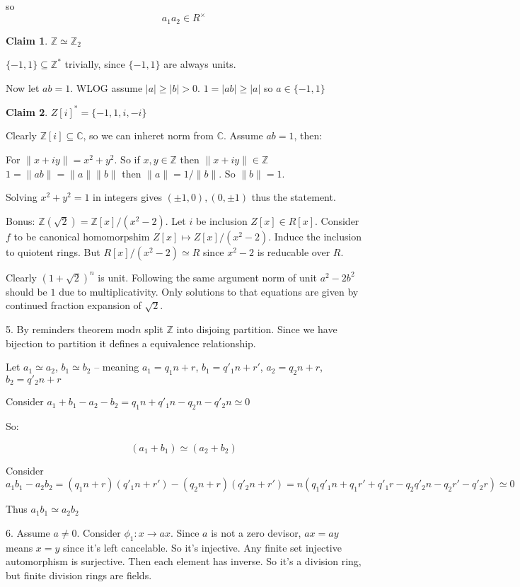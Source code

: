\documentclass{amsart}
\def\Z{\mathbb{Z}}
\def\C{\mathbb{C}}
\newtheorem{claim}{Claim}
\begin{document}
so $$a_1 a_2 \in R^{\times}$$

\begin{claim}
    $\Z \simeq \Z_2$
\end{claim}
$\{-1, 1\} \subseteq \Z^{*}$ trivially, since $\{-1,1\}$ are always units.

Now let $ab = 1$.  WLOG assume $|a| \geq |b| > 0$. $1 = |ab| \geq |a|$ so $a \in \{-1 , 1\}$

\begin{claim}
    $Z[i]^* = \{-1, 1, i, -i \}$ 
\end{claim}
Clearly $\Z[i] \subseteq \C$, so we can inheret norm from $\C$. Assume $ab = 1$, then:

For $\| x + iy \| = x^2 + y^2$. So if $x,y \in \Z$ then $\|x + i y \| \in \Z$
$1 = \|ab\| = \|a\| \|b\|$ then $\|a\| = 1 / \|b\|$. So $\| b \| = 1$.

Solving $x^2 + y^2 = 1$ in integers gives $(\pm 1,0), (0, \pm 1)$ thus the statement.

Bonus: $\Z (\sqrt{2}) = \Z[x] / (x^2 - 2 )$. Let $i$ be inclusion $Z[x] \in R[x]$. 
Consider $f$ to be canonical homomorpshim  $Z[x] \mapsto Z[x] / (x^2-2)$. Induce the inclusion to quiotent rings. But $R[x] / (x^2-2) \simeq R$ since $x^2 - 2$ is reducable over $R$.

Clearly $(1+\sqrt{2})^n$ is unit. Following the same argument norm of unit $a^2 - 2b^2$ should be $1$ due to multiplicativity. Only solutions to that equations are given by continued fraction expansion of $\sqrt{2}$.


5. By reminders theorem $\text{mod} n$ split $\Z$ into disjoing partition.
Since we have bijection to partition  it defines a equivalence relationship.

Let $a_1 \simeq a_2$, $b_1 \simeq b_2$ -- meaning $a_1 = q_1 n + r$, $b_1 = q'_1 n + r'$, $a_2 = q_2 n + r$, $b_2 = q'_2n + r$

Consider $a_1 + b_1 - a_2 - b_2 = q_1 n + q'_1 n - q_2 n - q'_2 n \simeq 0$ 

So:

$$(a_1 + b_1) \simeq (a_2 + b_2)$$

Consider $a_1 b_1 - a_2 b_2 = (q_1 n + r)(q'_1 n + r') - (q_2 n + r)(q'_2 n + r') = n(q_1 q'_1 n + q_1 r' + q'_1 r - q_2 q'_2 n - q_2 r' - q'_2 r) \simeq 0$

Thus $a_1 b_1 \simeq a_2 b_2$

6.
Assume $a \neq 0$. 
Consider $\phi_1: x\to ax$. Since $a$ is not a zero devisor, $ax = ay$ means $x = y$ since it's left cancelable. So it's injective. Any finite set injective automorphism is surjective. Then each element has inverse.
So it's a division ring, but finite division rings are fields.
\end{document}
